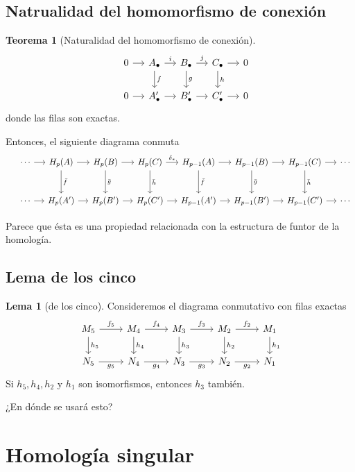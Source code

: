 \documentclass[spanish]{book}
\theoremstyle{definition}
\newtheorem*{lema}{Lema}
\newtheorem*{teo}{Teorema}
\begin{document}
\section{Natrualidad del homomorfismo de conexión}
	\begin{teo}[Naturalidad del homomorfismo de conexión]
		\[\begin{tikzcd}[column sep=small]
			&0\arrow{r}&A_\bullet\arrow{r}{i}\arrow{d}{f}&B_\bullet\arrow{r}{j}\arrow{d}{g}&C_\bullet\arrow{r}\arrow{d}{h}&0\\
			&0\arrow{r}&A'_\bullet\arrow{r}&B'_\bullet\arrow{r}&C'_\bullet\arrow{r}&0
		\end{tikzcd}\]
		donde las filas son exactas.\par
		Entonces, el siguiente diagrama conmuta
		\[\begin{tikzcd}[column sep=small, row sep=large]
			& \cdots \arrow{r} & H_p(A) \arrow{r} \arrow{d}{\bar{f}} & H_p(B) \arrow{r} \arrow{d}{\bar{g}} & H_p(C) \arrow{r}{\delta_*} \arrow{d}{\bar{h}} & H_{p-1}(A) \arrow{r} \arrow{d}{\bar{f}} & H_{p-1}(B) \arrow{r} \arrow{d}{\bar{g}} & H_{p-1}(C) \arrow{r} \arrow{d}{\bar{h}} & \cdots \\
			& \cdots \arrow{r} & H_p(A') \arrow{r} & H_p(B') \arrow{r} & H_p(C') \arrow{r} & H_{p-1}(A') \arrow{r} & H_{p-1}(B') \arrow{r} & H_{p-1}(C') \arrow{r} & \cdots
		\end{tikzcd}\]
	\end{teo}
	Parece que ésta es una propiedad relacionada con la estructura de funtor de la homología.
\section{Lema de los cinco}
	\begin{lema}[de los cinco]
		Consideremos el diagrama conmutativo con filas exactas
		\[\begin{tikzcd}
			M_5\arrow{r}{f_5}\arrow{d}{h_5}&M_4\arrow{r}{f_4}\arrow{d}{h_4}&M_3\arrow{r}{f_3}\arrow{d}{h_3}&M_2\arrow{r}{f_2}\arrow{d}{h_2}&M_1\arrow{d}{h_1}\\
			N_5\arrow[r,swap,"g_5"]&N_4\arrow[r,swap,"g_4"]&N_3\arrow[r,swap,"g_3"]&N_2\arrow[r,swap,"g_2"]&N_1
		\end{tikzcd}\]
		Si $h_5,h_4,h_2$ y $h_1$ son isomorfismos, entonces $h_3$ también.
	\end{lema}
	¿En dónde se usará esto?

\chapter{Homología singular}
\end{document}
